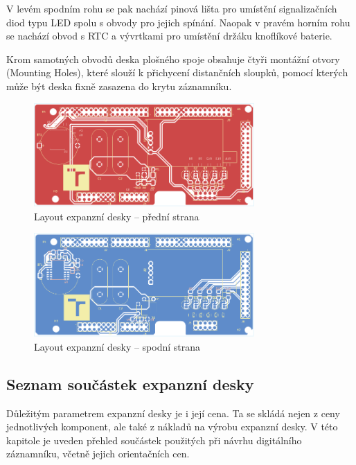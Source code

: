 V levém spodním rohu se pak nachází pinová lišta pro umístění signalizačních diod typu LED spolu s obvody pro jejich spínání. Naopak v pravém horním rohu se nachází obvod s RTC a vývrtkami pro umístění držáku knoflíkové baterie.

Krom samotných obvodů deska plošného spoje obsahuje čtyři montážní otvory (Mounting Holes), které slouží k přichycení distančních sloupků, pomocí kterých může být deska fixně zasazena do krytu záznamníku.

\begin{figure}[h]
    \centering
    \includegraphics[width=0.75\textwidth]{obrazky-figures/extension_shield-brd-front.pdf}
    
    \caption{Layout expanzní desky -- přední strana}
    \label{fig:neo-7m}
\end{figure}

\begin{figure}[h]
    \centering
    \includegraphics[width=0.75\textwidth]{obrazky-figures/extension_shield-brd-back.pdf}
    
    \caption{Layout expanzní desky -- spodní strana}
    \label{fig:neo-7m}
\end{figure}

\newpage


\subsection{Seznam součástek expanzní desky}
\label{bom_list}

Důležitým parametrem expanzní desky je i její cena. Ta se skládá nejen z ceny jednotlivých komponent, ale také z nákladů na výrobu expanzní desky. V této kapitole je uveden přehled součástek použitých při návrhu digitálního záznamníku, včetně jejich orientačních cen. 

